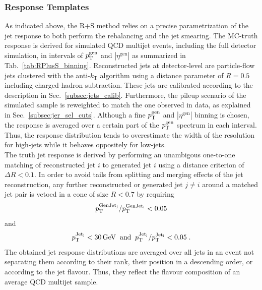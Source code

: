  \subsubsection*{Response Templates}
\label{subsubsec:qcd_response}
As indicated above, the R+S method relies on a precise parametrization of the jet response to both perform the rebalancing and the jet smearing. The MC-truth response is derived for simulated QCD multijet events, including the full detector simulation, in intervals of $p_{\text{T}}^\mathrm{gen}$ and $|\eta^\mathrm{gen}|$ as summarized in Tab.~\ref{tab:RPlusS_binning}. Reconstructed jets at detector-level are particle-flow jets clustered with the anti-$k_\mathrm{T}$ algorithm using a distance parameter of $R = 0.5$ including charged-hadron subtraction. These jets are calibrated according to the description in Sec.~\ref{subsec:jets_calib}. Furthermore, the pileup scenario of the simulated sample is reweighted to match the one observed in data, as explained in Sec.~\ref{subsec:jer_sel_cuts}. Although a fine $p_{\text{T}}^\mathrm{gen}$ and $|\eta^\mathrm{gen}|$ binning is chosen, the response is averaged over a certain part of the $p_{\text{T}}^\mathrm{gen}$ spectrum in each interval. Thus, the response distribution tends to overestimate the width of the resolution for high-\pt jets while it behaves oppositely for low-\pt jets. \\
The truth jet response is derived by performing an unambigous one-to-one matching of reconstructed jet $i$ to generated jet $i$ using a distance criterion of $\Delta R < 0.1$. In order to avoid tails from splitting and merging effects of the jet reconstruction, any further reconstructed or generated jet $j \ne i$ around a matched jet pair is vetoed in a cone of size $R < 0.7$ by requiring
\begin{equation}
 p_{\text{T}}^{\rm{GenJet}_j} / p_{\text{T}}^{\rm{GenJet}_i} < 0.05
\end{equation} 
and
\begin{equation}
 p_{\text{T}}^{\rm{Jet}_j} < 30\,\mathrm{GeV} \;\; \mathrm{and} \;\; p_{\text{T}}^{\rm{Jet}_j} / p_{\text{T}}^{\rm{Jet}_i} < 0.05 \; .
\end{equation} 
The obtained jet response distributions are averaged over all jets in an event not separating them according to their rank, \ie their position in a descending \pt order, or according to the jet flavour. Thus, they reflect the flavour composition of an average QCD multijet sample. 
